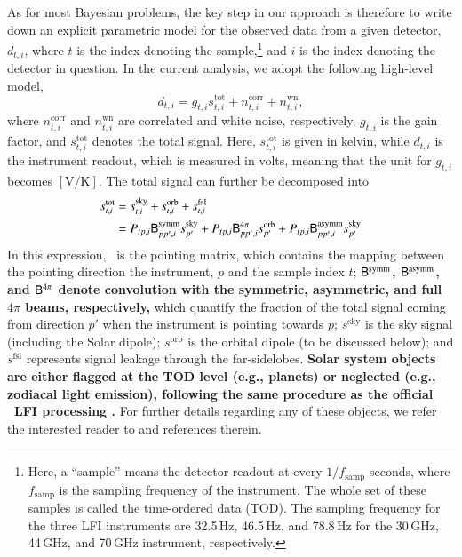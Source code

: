 \documentclass[twocolumn]{aa}
\newcommand{\B}[0]{\tens{B}}
\renewcommand{\P}[0]{\tens{P}}
\newcommand{\ti}[0]{_{t, i}}
\newcommand{\tot}[0]{^{\mathrm{tot}}}
\newcommand{\corr}[0]{^{\mathrm{corr}}}
\newcommand{\wn}[0]{^{\mathrm{wn}}}
\newcommand{\sky}[0]{^{\mathrm{sky}}}
\newcommand{\orb}[0]{^{\mathrm{orb}}}
\begin{document}
As for most Bayesian problems, the key step in our approach is therefore to write down an explicit parametric model for the observed data from a given detector, $d\ti$, where $t$ is the index denoting the sample,\footnote{Here, a ``sample'' means the detector readout at every $1/f_\mathrm{samp}$ seconds, where $f_\mathrm{samp}$ is the sampling frequency of the instrument. The whole set of these samples is called the time-ordered data (TOD). The sampling frequency for the three LFI instruments are 32.5\,Hz, 46.5\,Hz, and 78.8\,Hz for the 30\,GHz, 44\,GHz, and 70\,GHz instrument, respectively.} and $i$ is the index denoting the detector in question. In the current analysis, we adopt the following high-level model,
\begin{equation}
    d\ti = g\ti s\ti\tot + n\ti\corr + n\ti\wn,
    \label{eq:gen_data_model}
\end{equation}
where $n\ti\corr$ and $n\ti\wn$ are correlated and white noise, respectively, $g\ti$ is the gain factor, and $s\ti\tot$ denotes the total signal. Here, $s\ti\tot$ is given in kelvin, while $d\ti$ is the instrument readout, which is measured in volts, meaning that the unit for $g\ti$ becomes $[\mathrm{V/K}]$. The total signal can further be decomposed into
\begin{align}
    s\ti\tot &= s\ti\sky + s\ti\orb + s\ti^{\mathrm{fsl}} \nonumber \\ 
    &= P_{tp, i}\B^{\mathrm{symm}}_{pp', i} s_{p'}\sky + P_{tp, i}\B^{\mathrm{4\pi}}_{pp', i}s_{p'}\orb + P_{tp, i}\B^{\mathrm{asymm}}_{pp', i}s_{p'}^{\mathrm{sky}} %
\end{align}
In this expression, \P\ is the pointing matrix, which contains the mapping between the pointing direction the instrument, $p$ and the sample index $t$; \textbf{$\B^{\mathrm{symm}}$, $\B^{\mathrm{asymm}}$, and $\B^{4\pi}$ denote convolution with the symmetric, asymmetric, and full $4\pi$ beams, respectively,} which quantify the fraction of the total signal coming from direction $p'$ when the instrument is pointing towards $p$; $s^{\mathrm{sky}}$ is the sky signal (including the Solar dipole); $s^{\mathrm{orb}}$ is the orbital dipole (to be discussed below); and $s^{\mathrm{fsl}}$ represents signal leakage through the far-sidelobes. \textbf{Solar system objects are either flagged at the TOD level (e.g., planets) or neglected (e.g., zodiacal light emission), following the same procedure as the official \Planck\ LFI processing \citep{planck2016-l02}.} For further details regarding any of these objects, we refer the interested reader to \citet{bp01} and references therein.
\end{document}
